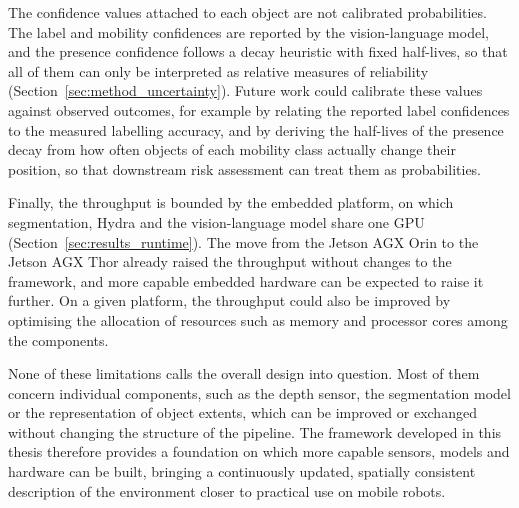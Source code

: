 {\small The confidence values attached to each object are not calibrated probabilities. The label and mobility confidences are reported by the vision-language model, and the presence confidence follows a decay heuristic with fixed half-lives, so that all of them can only be interpreted as relative measures of reliability (Section~\ref{sec:method_uncertainty}). Future work could calibrate these values against observed outcomes, for example by relating the reported label confidences to the measured labelling accuracy, and by deriving the half-lives of the presence decay from how often objects of each mobility class actually change their position, so that downstream risk assessment can treat them as probabilities.\par}

{\small Finally, the throughput is bounded by the embedded platform, on which segmentation, Hydra and the vision-language model share one GPU (Section~\ref{sec:results_runtime}). The move from the Jetson AGX Orin to the Jetson AGX Thor already raised the throughput without changes to the framework, and more capable embedded hardware can be expected to raise it further. On a given platform, the throughput could also be improved by optimising the allocation of resources such as memory and processor cores among the components.\par}

{\small None of these limitations calls the overall design into question. Most of them concern individual components, such as the depth sensor, the segmentation model or the representation of object extents, which can be improved or exchanged without changing the structure of the pipeline. The framework developed in this thesis therefore provides a foundation on which more capable sensors, models and hardware can be built, bringing a continuously updated, spatially consistent description of the environment closer to practical use on mobile robots.\par}